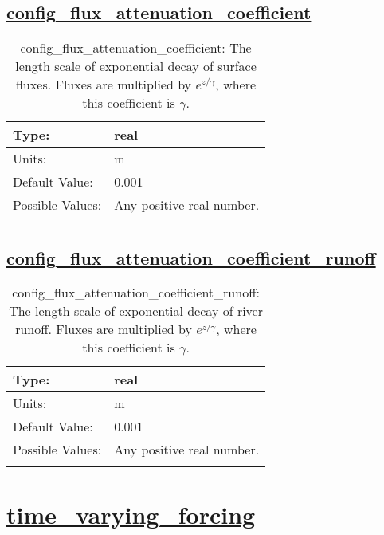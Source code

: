 \subsection[config\_flux\_attenuation\_coefficient]{\hyperref[sec:nm_tab_forcing]{config\_flux\_attenuation\_coefficient}}
\label{subsec:nm_sec_config_flux_attenuation_coefficient}
\begin{center}
\begin{longtable}{| p{2.0in} || p{4.0in} |}
    \hline
    Type: & real \\
    \hline
    Units: & \si{m} \\
    \hline
    Default Value: & 0.001 \\
    \hline
    Possible Values: & Any positive real number. \\
    \hline
    \caption{config\_flux\_attenuation\_coefficient: The length scale of exponential decay of surface fluxes. Fluxes are multiplied by $e^{z/\gamma}$, where this coefficient is $\gamma$.}
\end{longtable}
\end{center}
\subsection[config\_flux\_attenuation\_coefficient\_runoff]{\hyperref[sec:nm_tab_forcing]{config\_flux\_attenuation\_coefficient\_runoff}}
\label{subsec:nm_sec_config_flux_attenuation_coefficient_runoff}
\begin{center}
\begin{longtable}{| p{2.0in} || p{4.0in} |}
    \hline
    Type: & real \\
    \hline
    Units: & \si{m} \\
    \hline
    Default Value: & 0.001 \\
    \hline
    Possible Values: & Any positive real number. \\
    \hline
    \caption{config\_flux\_attenuation\_coefficient\_runoff: The length scale of exponential decay of river runoff. Fluxes are multiplied by $e^{z/\gamma}$, where this coefficient is $\gamma$.}
\end{longtable}
\end{center}
\section[time\_varying\_forcing]{\hyperref[sec:nm_tab_time_varying_forcing]{time\_varying\_forcing}}
\label{sec:nm_sec_time_varying_forcing}
